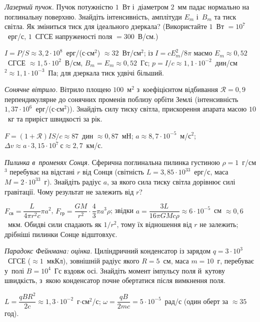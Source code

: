 \begin{problem}\label{prb:LaserBeam}
	\emph{Лазерний пучок.} Пучок потужністю $1$~Вт і~діаметром $2$~мм падає нормально на поглинальну поверхню. Знайдіть інтенсивність, амплітуди $E_m$ і~$B_m$ та тиск світла. Як зміниться тиск для ідеального дзеркала? (Використайте $1$~Вт $=10^{7}$~ерг/с, $1$~СГСЕ напруженості поля $=300$~В/см.)
	\begin{solution}
		$I=P/S\approx3{,}2\cdot10^{8}$~ерг/(с$\cdot$см$^2$) $\approx32$~Вт/см$^2$; із $I=cE_m^2/8\pi$ маємо $E_m\approx0{,}52$~СГСЕ $\approx1{,}5\cdot10^{2}$~В/см, $B_m=E_m\approx0{,}52$~Гс; $p=I/c\approx1{,}1\cdot10^{-2}$~дин/см$^2\approx1{,}1\cdot10^{-3}$~Па; для дзеркала тиск удвічі більший.
	\end{solution}
\end{problem}

\begin{problem}\label{prb:SolarSail}
	\emph{Сонячне вітрило.} Вітрило площею $100$~м$^2$ з~коефіцієнтом відбивання $\mathcal R=0{,}9$ перпендикулярне до сонячних променів поблизу орбіти Землі (інтенсивність $1{,}37\cdot10^{6}$~ерг/(с$\cdot$см$^2$)). Знайдіть силу тиску світла, прискорення апарата масою $10$~кг та приріст швидкості за рік.
	\begin{solution}
		$F=(1+\mathcal R)IS/c\approx87$~дин $\approx0{,}87$~мН; $a\approx8{,}7\cdot10^{-5}$~м/с$^2$; $\Delta v\approx a\cdot3{,}15\cdot10^{7}~\text{с}\approx2{,}7$~км/с.
	\end{solution}
\end{problem}

\begin{problem}\label{prb:DustGrain}
	\emph{Пилинка в~променях Сонця.} Сферична поглинальна пилинка густиною $\rho=1$~г/см$^3$ перебуває на відстані $r$ від Сонця (світність $L=3{,}85\cdot10^{33}$~ерг/с, маса $M=2\cdot10^{33}$~г). Знайдіть радіус $a$, за якого сила тиску світла дорівнює силі гравітації. Чому результат не залежить від $r$?
	\begin{solution}
		$F_\text{св}=\dfrac{L}{4\pi r^2c}\pi a^2$, $F_\text{гр}=\dfrac{GM}{r^2}\cdot\dfrac43\pi a^3\rho$; звідки $a=\dfrac{3L}{16\pi GMc\rho}\approx6\cdot10^{-5}$~см $\approx0{,}6$~мкм. Обидві сили спадають як $1/r^2$, тому їх відношення від $r$ не залежить; дрібніші пилинки Сонце відштовхує.
	\end{solution}
\end{problem}

\begin{problem}\label{prb:FeynmanNumbers}
	\emph{Парадокс Фейнмана: оцінка.} Циліндричний конденсатор із зарядом $q=3\cdot10^{3}$~СГСЕ ($\approx1$~мкКл), зовнішній радіус якого $R=5$~см, маса $m=10$~г, перебуває у~полі $B=10^{4}$~Гс вздовж осі. Знайдіть момент імпульсу поля й~кутову швидкість, з~якою конденсатор почне обертатися після вимкнення поля.
	\begin{solution}
		$L=\dfrac{qBR^2}{2c}\approx1{,}3\cdot10^{-2}$~г$\cdot$см$^2$/с; $\omega=\dfrac{qB}{2mc}=5\cdot10^{-5}$~рад/с (один оберт за $\approx35$ год).
	\end{solution}
\end{problem}

